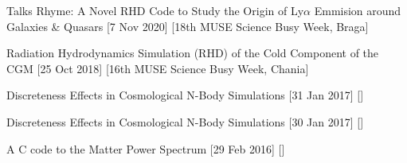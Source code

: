 \begin{cvsection}{Talks}
    \cvitem
    {Rhyme: A Novel RHD Code to Study the Origin of Ly$\alpha$ Emmision around Galaxies \& Quasars}
    [7 Nov 2020]
    [18th MUSE Science Busy Week, Braga]
    
    \cvitem
    {Radiation Hydrodynamics Simulation (RHD) of the Cold Component of the CGM}
    [25 Oct 2018]
    [16th MUSE Science Busy Week, Chania]
    
    \cvitem
    {Discreteness Effects in Cosmological N-Body Simulations}
    [31 Jan 2017]
    [\AIfA]
    
    \cvitem
    {Discreteness Effects in Cosmological N-Body Simulations}
    [30 Jan 2017]
    [\eth]
    
    \cvitem
    {A C code to the Matter Power Spectrum}
    [29 Feb 2016]
    [\AIfA]
\end{cvsection}